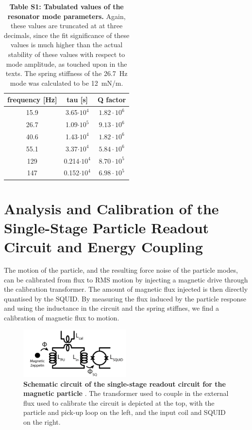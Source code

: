 \begin{appendices}
\begin{table}[t]
    \large
    \centering
\begin{tabular}{|c||c|c|} %
 \hline
frequency [Hz] & tau [s] & Q factor\\ [0.5ex] 
 \hline%
 15.9 & 3.65$\cdot10^{4}$  & $1.82 \cdot 10^{6}$  \\ 
 \hline
 26.7 & 1.09$\cdot10^{5}$ & $9.13 \cdot 10^{6}$  \\
 \hline
 40.6 & 1.43$\cdot10^{4}$ & $1.82 \cdot 10^{6}$  \\
 \hline
 55.1 & 3.37$\cdot10^{4}$ & $5.84 \cdot 10^{6}$ \\
 \hline
 129 & 0.214$\cdot10^{4}$ & $8.70 \cdot 10^{5}$ \\
 \hline
 147 & 0.152$\cdot10^{4}$ & $6.98 \cdot 10^{5}$ \\
 \hline
\end{tabular}
\caption*{\textbf{Table S1: Tabulated values of the resonator mode parameters.} Again, these values are truncated at at three decimals, since the fit significance of these values is much higher than the actual stability of these values with respect to mode amplitude, as touched upon in the texts. The spring stiffness of the \SI{26.7}{Hz} mode was calculated to be \SI{12}{mN/m}.}\label{tab_supp:tauQ}
\end{table}

\clearpage

\section{Analysis and Calibration of the Single-Stage Particle Readout Circuit and Energy Coupling}
\label{app:calibration}
The motion of the particle, and the resulting force noise of the particle modes, can be calibrated from flux to RMS motion by injecting a magnetic drive through the calibration transformer. The amount of magnetic flux injected is then directly quantised by the SQUID. By measuring the flux induced by the particle response and using the inductance in the circuit and the spring stiffnes, we find a calibration of magnetic flux to motion. 

\begin{figure}[ht]%
\centering
\includegraphics[width=0.5\textwidth]{Appenidx/MLMP_circuit.pdf}%
\caption{\textbf{Schematic circuit of the single-stage readout circuit for the magnetic particle }. The transformer used to couple in the external flux used to calibrate the circuit is depicted at the top, with the particle and pick-up loop on the left, and the input coil and SQUID on the right. }\label{fig_supp:readout_circuit}
\end{figure}


\end{appendices}
